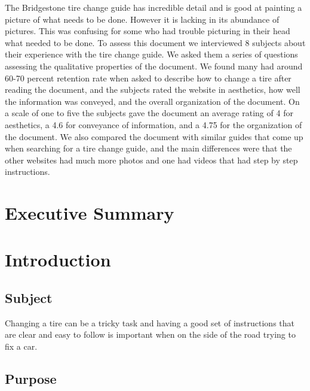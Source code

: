 \documentclass[12pt,A4paper]{article}
\begin{document}
	The Bridgestone tire change guide has incredible detail and is good at painting a picture of what needs to be done. However it is lacking in its abundance of pictures. This was confusing for some who had trouble picturing in their head what needed to be done. To assess this document we interviewed 8 subjects about their experience with the tire change guide. We asked them a series of questions assessing the qualitative properties of the document. We found many had around 60-70 percent retention rate when asked to describe how to change a tire after reading the document, and the subjects rated the website in aesthetics, how well the information was conveyed, and the overall organization of the document. On a scale of one to five the subjects gave the document an average rating of 4 for aesthetics, a 4.6 for conveyance of information, and a 4.75 for the organization of the document. We also compared the document with similar guides that come up when searching for a tire change guide, and the main differences were that the other websites had much more photos and one had videos that had step by step instructions.
	
	\clearpage
	
	\setcounter{page}{2}
	
	\tableofcontents

	
	\renewcommand\listfigurename{List of Illustrations}
	\listoffigures

	\clearpage
	\section{Executive Summary}

	\section{Introduction}
	
		\subsection{Subject}
		Changing a tire can be a tricky task and having a good set of instructions that are clear and easy to follow is important when on the side of the road trying to fix a car.

		\subsection{Purpose}
\end{document}
